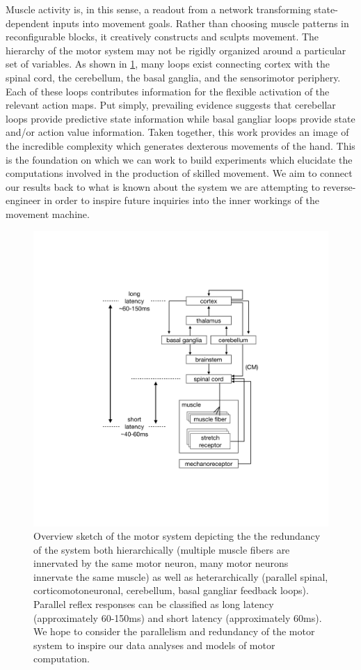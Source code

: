 \documentclass[
  a4paper,
]{article}
\begin{document}
Muscle activity is, in this sense, a readout from a network transforming
state-dependent inputs into movement goals. Rather than choosing muscle
patterns in reconfigurable blocks, it creatively constructs and sculpts
movement. The hierarchy of the motor system may not be rigidly organized
around a particular set of variables. As shown in
\cref{fig:motor_system}, many loops exist connecting cortex with the
spinal cord, the cerebellum, the basal ganglia, and the sensorimotor
periphery. Each of these loops contributes information for the flexible
activation of the relevant action maps. Put simply, prevailing evidence
suggests that cerebellar loops provide predictive state information
while basal gangliar loops provide state and/or action value
information. Taken together, this work provides an image of the
incredible complexity which generates dexterous movements of the hand.
This is the foundation on which we can work to build experiments which
elucidate the computations involved in the production of skilled
movement. We aim to connect our results back to what is known about the
system we are attempting to reverse-engineer in order to inspire future
inquiries into the inner workings of the movement machine.

\begin{figure}
\hypertarget{fig:motor_system}{%
\centering
\includegraphics[width=1\textwidth,height=\textheight]{images/physiology/motor_system/motor_system.pdf}
\caption{Overview sketch of the motor system depicting the the
redundancy of the system both hierarchically (multiple muscle fibers are
innervated by the same motor neuron, many motor neurons innervate the
same muscle) as well as heterarchically (parallel spinal,
corticomotoneuronal, cerebellum, basal gangliar feedback loops).
Parallel reflex responses can be classified as long latency
(approximately 60-150ms) and short latency (approximately 60ms). We hope
to consider the parallelism and redundancy of the motor system to
inspire our data analyses and models of motor
computation.}\label{fig:motor_system}
}
\end{figure}
\end{document}
